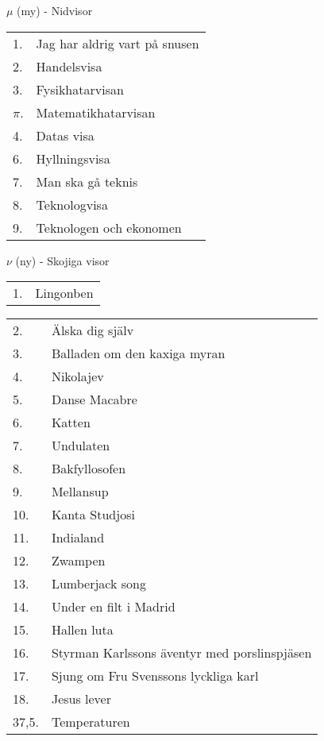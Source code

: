 \documentclass[a6paper,10pt]{article}
\begin{document}
\vspace{-6pt}
\noindent
\Large $\mu$ (my) - Nidvisor
\vspace{-5pt}
\begin{table}[!h]
\begin{tabularx}{1\textwidth}{l X}
1.&Jag har aldrig vart på snusen\\
2.&Handelsvisa\\
3.&Fysikhatarvisan\\
$\pi$.&Matematikhatarvisan\\
4.&Datas visa\\
6.&Hyllningsvisa\\
7.&Man ska gå teknis \\
8.&Teknologvisa\\
9.&Teknologen och ekonomen
\end{tabularx}
\end{table}

\noindent
\Large $\nu$ (ny) - Skojiga visor
\vspace{-5pt}
\begin{table}[!h]
\begin{tabularx}{1\textwidth}{l X}
1.&Lingonben\\
\end{tabularx}
\end{table}
\begin{table}[!h]
\begin{tabularx}{1\textwidth}{l X}
2.&Älska dig själv\\
3.&Balladen om den kaxiga myran\\
4.&Nikolajev\\
5.&Danse Macabre\\
6.&Katten \\
7.&Undulaten \\
8.&Bakfyllosofen\\
9.&Mellansup\\
10.&Kanta Studjosi\\
11.&Indialand\\
12.&Zwampen\\
13.&Lumberjack song\\
14.&Under en filt i Madrid\\
15.&Hallen luta\\
16.&Styrman Karlssons äventyr med porslinspjäsen\\
17.&Sjung om Fru Svenssons lyckliga karl\\
18.&Jesus lever\\
37,5.&Temperaturen
\end{tabularx}
\end{table}
\end{document}
